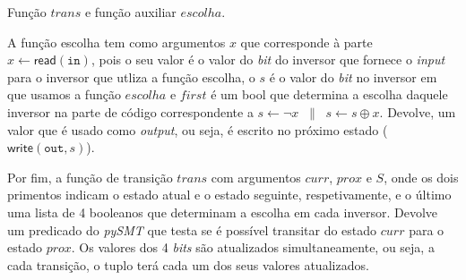 \documentclass[11pt]{article}
\begin{document}
    Função \(trans\) e função auxiliar \(escolha\).

A função escolha tem como argumentos \(x\) que corresponde à parte
\(x \gets \mathsf{read}(\mathtt{in})\), pois o seu valor é o valor do
\emph{bit} do inversor que fornece o \emph{input} para o inversor que
utliza a função escolha, o \(s\) é o valor do \emph{bit} no inversor em
que usamos a função \(escolha\) e \(first\) é um bool que determina a
escolha daquele inversor na parte de código correspondente a
\(s \gets \neg x\;\;\|\;\; s\gets s\oplus x\). Devolve, um valor que é
usado como \emph{output}, ou seja, é escrito no próximo estado
(\(\mathsf{write}(\mathtt{out},s)\)).

Por fim, a função de transição \(trans\) com argumentos \(curr\),
\(prox\) e \(S\), onde os dois primentos indicam o estado atual e o
estado seguinte, respetivamente, e o último uma lista de 4 booleanos que
determinam a escolha em cada inversor. Devolve um predicado do
\emph{pySMT} que testa se é possível transitar do estado \(curr\) para o
estado \(prox\). Os valores dos 4 \emph{bits} são atualizados
simultaneamente, ou seja, a cada transição, o tuplo terá cada um dos
seus valores atualizados.
\end{document}
